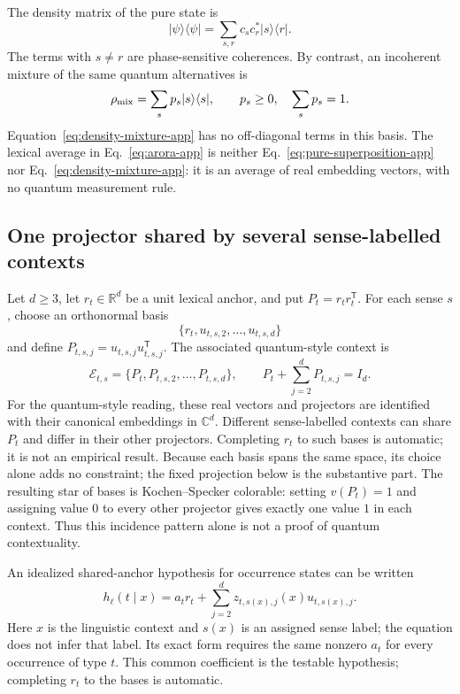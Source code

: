 \documentclass[
  aps,
  reprint,
  superscriptaddress,
  floatfix,
  nofootinbib,
  longbibliography
]{revtex4-2}
\newcommand{\R}{\mathbb{R}}
\newcommand{\T}{^{\mathsf T}}
\begin{document}
The density matrix of the pure state is
\begin{equation}
 |\psi\rangle\langle\psi|
 =\sum_{s,r}c_s c_r^*|s\rangle\langle r|.
 \label{eq:pure-density-app}
\end{equation}
The terms with $s\ne r$ are phase-sensitive coherences.  By contrast, an
incoherent mixture of the same quantum alternatives is
\begin{equation}
 \rho_{\rm mix}=\sum_s p_s|s\rangle\langle s|,
 \qquad p_s\geq0,\quad\sum_s p_s=1.
 \label{eq:density-mixture-app}
\end{equation}
Equation~\eqref{eq:density-mixture-app} has no off-diagonal terms in this
basis.  The lexical average in Eq.~\eqref{eq:arora-app} is neither
Eq.~\eqref{eq:pure-superposition-app} nor
Eq.~\eqref{eq:density-mixture-app}: it is an average of real embedding
vectors, with no quantum measurement rule.

\subsection{One projector shared by several sense-labelled contexts}

Let $d\geq3$, let $r_t\in\R^d$ be a unit lexical anchor, and put
$P_t=r_t r_t\T$.  For each sense $s$, choose an orthonormal basis
\begin{equation}
 \{r_t,u_{t,s,2},\ldots,u_{t,s,d}\}
 \label{eq:residual-basis-app}
\end{equation}
and define $P_{t,s,j}=u_{t,s,j}u_{t,s,j}\T$.  The associated quantum-style
context is
\begin{equation}
 \mathcal E_{t,s}
 =\{P_t,P_{t,s,2},\ldots,P_{t,s,d}\},
 \qquad
 P_t+\sum_{j=2}^{d}P_{t,s,j}=I_d.
 \label{eq:context-hyperedge-app}
\end{equation}
For the quantum-style reading, these real vectors and projectors are identified
with their canonical embeddings in $\mathbb C^d$.
Different sense-labelled contexts can share $P_t$ and differ in their other
projectors.  Completing $r_t$ to such bases is automatic; it is not an
empirical result.  Because each basis spans the same space, its choice alone
adds no constraint; the fixed projection below is the substantive part.
The resulting star of bases is Kochen--Specker colorable: setting
$v(P_t)=1$ and assigning value $0$ to every other projector gives exactly one
value $1$ in each context.  Thus this incidence pattern alone is not a proof
of quantum contextuality.

An idealized shared-anchor hypothesis for occurrence states can be written
\begin{equation}
 h_\ell(t\mid x)
 =a_t r_t+\sum_{j=2}^{d}z_{t,s(x),j}(x)u_{t,s(x),j} .
 \label{eq:shared-anchor-app}
\end{equation}
Here $x$ is the linguistic context and $s(x)$ is an assigned sense label; the
equation does not infer that label.  Its exact form requires the same
nonzero $a_t$ for every occurrence of type $t$.  This common coefficient is
the testable hypothesis; completing $r_t$ to the bases is automatic.
\end{document}

